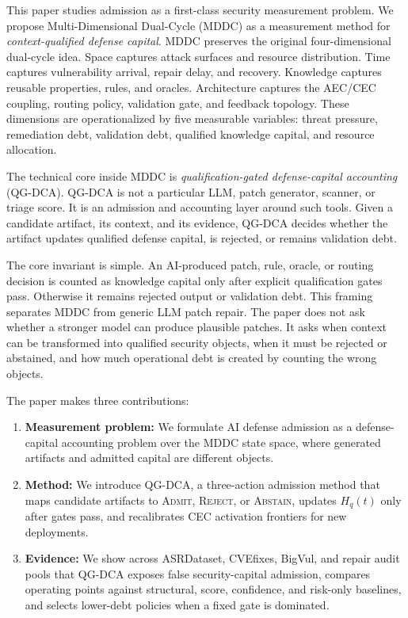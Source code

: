 ﻿\documentclass[lettersize,journal]{IEEEtran}
\begin{document}
This paper studies admission as a first-class security measurement problem. We propose Multi-Dimensional Dual-Cycle (MDDC) as a measurement method for \emph{context-qualified defense capital}. MDDC preserves the original four-dimensional dual-cycle idea. Space captures attack surfaces and resource distribution. Time captures vulnerability arrival, repair delay, and recovery. Knowledge captures reusable properties, rules, and oracles. Architecture captures the AEC/CEC coupling, routing policy, validation gate, and feedback topology. These dimensions are operationalized by five measurable variables: threat pressure, remediation debt, validation debt, qualified knowledge capital, and resource allocation.

The technical core inside MDDC is \emph{qualification-gated defense-capital accounting} (QG-DCA). QG-DCA is not a particular LLM, patch generator, scanner, or triage score. It is an admission and accounting layer around such tools. Given a candidate artifact, its context, and its evidence, QG-DCA decides whether the artifact updates qualified defense capital, is rejected, or remains validation debt.

The core invariant is simple. An AI-produced patch, rule, oracle, or routing decision is counted as knowledge capital only after explicit qualification gates pass. Otherwise it remains rejected output or validation debt. This framing separates MDDC from generic LLM patch repair. The paper does not ask whether a stronger model can produce plausible patches. It asks when context can be transformed into qualified security objects, when it must be rejected or abstained, and how much operational debt is created by counting the wrong objects.

The paper makes three contributions:
\begin{enumerate}
    \item \textbf{Measurement problem:} We formulate AI defense admission as a defense-capital accounting problem over the MDDC state space, where generated artifacts and admitted capital are different objects.
    \item \textbf{Method:} We introduce QG-DCA, a three-action admission method that maps candidate artifacts to \textsc{Admit}, \textsc{Reject}, or \textsc{Abstain}, updates $H_q(t)$ only after gates pass, and recalibrates CEC activation frontiers for new deployments.
    \item \textbf{Evidence:} We show across ASRDataset, CVEfixes, BigVul, and repair audit pools that QG-DCA exposes false security-capital admission, compares operating points against structural, score, confidence, and risk-only baselines, and selects lower-debt policies when a fixed gate is dominated.
\end{enumerate}
\end{document}
